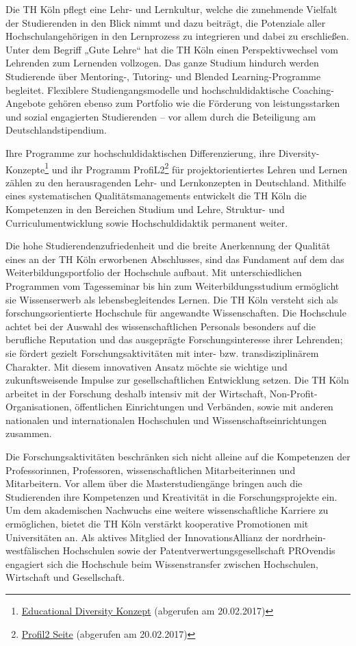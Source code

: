 Die TH Köln pflegt eine Lehr- und Lernkultur, welche die zunehmende
Vielfalt der Studierenden in den Blick nimmt und dazu beiträgt, die
Potenziale aller Hochschulangehörigen in den Lernprozess zu integrieren
und dabei zu erschließen. Unter dem Begriff „Gute Lehre`` hat die TH
Köln einen Perspektivwechsel vom Lehrenden zum Lernenden vollzogen. Das
ganze Studium hindurch werden Studierende über Mentoring-, Tutoring- und
Blended Learning-Programme begleitet. Flexiblere Studiengangsmodelle und
hochschuldidaktische Coaching-Angebote gehören ebenso zum Portfolio wie
die Förderung von leistungsstarken und sozial engagierten Studierenden
-- vor allem durch die Beteiligung am Deutschlandstipendium.

Ihre Programme zur hochschuldidaktischen Differenzierung, ihre
Diversity-Konzepte\footnote{\href{https://www.th-koeln.de/hochschule/educational-diversity_5710.php}{Educational
  Diversity Konzept} (abgerufen am 20.02.2017)} und ihr Programm
ProfiL2\footnote{\href{https://www.th-koeln.de/hochschule/profil_5676.php}{Profil2
  Seite} (abgerufen am 20.02.2017)} für projektorientiertes Lehren und
Lernen zählen zu den herausragenden Lehr- und Lernkonzepten in
Deutschland. Mithilfe eines systematischen Qualitätsmanagements
entwickelt die TH Köln die Kompetenzen in den Bereichen Studium und
Lehre, Struktur- und Curriculumentwicklung sowie Hochschuldidaktik
permanent weiter.

Die hohe Studierendenzufriedenheit und die breite Anerkennung der
Qualität eines an der TH Köln erworbenen Abschlusses, sind das Fundament
auf dem das Weiterbildungsportfolio der Hochschule aufbaut. Mit
unterschiedlichen Programmen vom Tagesseminar bis hin zum
Weiterbildungsstudium ermöglicht sie Wissenserwerb als
lebensbegleitendes Lernen. Die TH Köln versteht sich als
forschungsorientierte Hochschule für angewandte Wissenschaften. Die
Hochschule achtet bei der Auswahl des wissenschaftlichen Personals
besonders auf die berufliche Reputation und das ausgeprägte
Forschungsinteresse ihrer Lehrenden; sie fördert gezielt
Forschungsaktivitäten mit inter- bzw. transdisziplinärem Charakter. Mit
diesem innovativen Ansatz möchte sie wichtige und zukunftsweisende
Impulse zur gesellschaftlichen Entwicklung setzen. Die TH Köln arbeitet
in der Forschung deshalb intensiv mit der Wirtschaft,
Non-Profit-Organisationen, öffentlichen Einrichtungen und Verbänden,
sowie mit anderen nationalen und internationalen Hochschulen und
Wissenschaftseinrichtungen zusammen.

Die Forschungsaktivitäten beschränken sich nicht alleine auf die
Kompetenzen der Professorinnen, Professoren, wissenschaftlichen
Mitarbeiterinnen und Mitarbeitern. Vor allem über die Masterstudiengänge
bringen auch die Studierenden ihre Kompetenzen und Kreativität in die
Forschungsprojekte ein. Um dem akademischen Nachwuchs eine weitere
wissenschaftliche Karriere zu ermöglichen, bietet die TH Köln verstärkt
kooperative Promotionen mit Universitäten an. Als aktives Mitglied der
InnovationsAllianz der nordrhein-westfälischen Hochschulen sowie der
Patentverwertungsgesellschaft PROvendis engagiert sich die Hochschule
beim Wissenstransfer zwischen Hochschulen, Wirtschaft und Gesellschaft.

